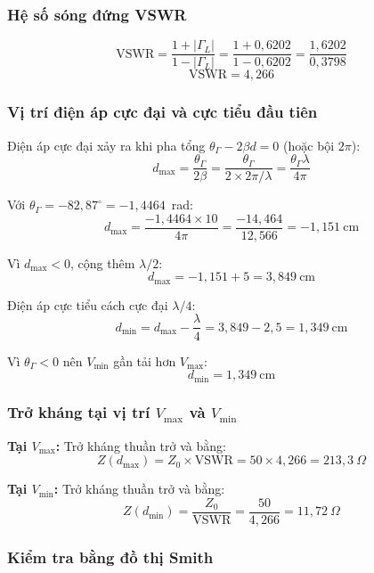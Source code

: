 \documentclass[12pt,a4paper]{article}
\begin{document}
\subsubsection{Hệ số sóng đứng VSWR}

\[
\text{VSWR} = \frac{1 + |\Gamma_L|}{1 - |\Gamma_L|} = \frac{1 + 0{,}6202}{1 - 0{,}6202} = \frac{1{,}6202}{0{,}3798}
\]
\[
\boxed{\text{VSWR} = 4{,}266}
\]

\subsubsection{Vị trí điện áp cực đại và cực tiểu đầu tiên}

Điện áp cực đại xảy ra khi pha tổng $\theta_\Gamma - 2\beta d = 0$ (hoặc bội $2\pi$):
\[
d_{\max} = \frac{\theta_\Gamma}{2\beta} = \frac{\theta_\Gamma}{2 \times 2\pi/\lambda} = \frac{\theta_\Gamma \lambda}{4\pi}
\]

Với $\theta_\Gamma = -82{,}87^\circ = -1{,}4464$~rad:
\[
d_{\max} = \frac{-1{,}4464 \times 10}{4\pi} = \frac{-14{,}464}{12{,}566} = -1{,}151~\text{cm}
\]

Vì $d_{\max} < 0$, cộng thêm $\lambda/2$:
\[
d_{\max} = -1{,}151 + 5 = \boxed{3{,}849~\text{cm}}
\]

Điện áp cực tiểu cách cực đại $\lambda/4$:
\[
d_{\min} = d_{\max} - \frac{\lambda}{4} = 3{,}849 - 2{,}5 = 1{,}349~\text{cm}
\]

Vì $\theta_\Gamma < 0$ nên $V_{\min}$ gần tải hơn $V_{\max}$:
\[
\boxed{d_{\min} = 1{,}349~\text{cm}}
\]

\subsubsection{Trở kháng tại vị trí $V_{\max}$ và $V_{\min}$}

\textbf{Tại $V_{\max}$:} Trở kháng thuần trở và bằng:
\[
Z(d_{\max}) = Z_0 \times \text{VSWR} = 50 \times 4{,}266 = \boxed{213{,}3~\Omega}
\]

\textbf{Tại $V_{\min}$:} Trở kháng thuần trở và bằng:
\[
Z(d_{\min}) = \frac{Z_0}{\text{VSWR}} = \frac{50}{4{,}266} = \boxed{11{,}72~\Omega}
\]

\subsubsection{Kiểm tra bằng đồ thị Smith}
\end{document}
